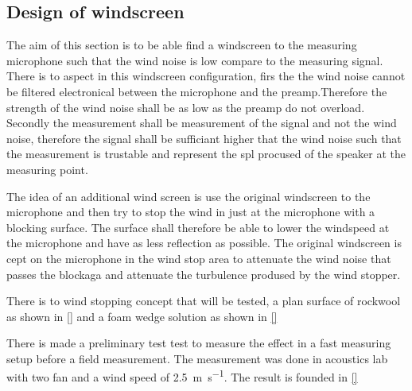 \subsection{Design of windscreen}
The aim of this section is to be able find a windscreen to the measuring microphone such that the wind noise is low compare to the measuring signal. There is to aspect in this windscreen configuration, firs the the wind noise cannot be filtered electronical between the microphone and the preamp.Therefore the strength of the wind noise shall be as low as the preamp do not overload. Secondly the measurement shall be measurement of the signal and not the wind noise, therefore the signal shall be sufficiant higher that the wind noise such that the measurement is trustable and represent the \gls{spl} procused of the speaker at the measuring point. 

The idea of an additional wind screen is use the original windscreen to the microphone and then try to stop the wind in just at the microphone with a blocking surface. The surface shall therefore be able to lower the windspeed at the microphone and have as less reflection as possible. The original windscreen is cept on the microphone in the wind stop area to attenuate the wind noise that passes the blockaga and attenuate the turbulence prodused by the wind stopper. 

There is to wind stopping concept that will be tested, a plan surface of rockwool as shown in \autoref{} and a foam wedge solution as shown in \autoref{}
    
    

There is made a preliminary test test to measure the effect in a fast measuring setup before a field measurement. The measurement was done in acoustics lab with two fan and a wind speed of \SI{2.5}{\meter\per\second}. The result is founded in \autoref{}




